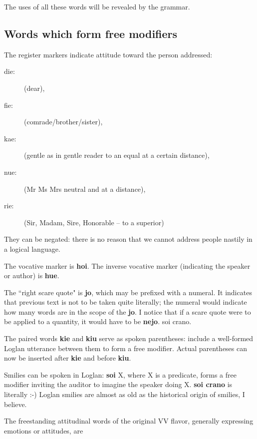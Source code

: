 \documentclass[12pt]{book}
\begin{document}
{The uses of all these words will be revealed by the grammar.

\subsection{Words which form free modifiers}

The register markers indicate attitude toward the person addressed:  

\begin{description}

\item[die:] (dear), \item[fie:] (comrade/brother/sister), \item[kae:] (gentle as in gentle reader to an equal at a certain distance), \item[nue:] (Mr Ms Mrs neutral and at a distance),\item[rie:] (Sir, Madam, Sire, Honorable -- to a superior)

\end{description}   They can be negated:  there is no reason that we cannot address people nastily in a logical language.

The vocative marker is {\bf hoi}.   The inverse vocative marker (indicating the speaker or author) is {\bf hue}.

The ``right scare quote" is {\bf jo}, which may be prefixed with a numeral.   It indicates that previous text is not to be taken quite literally; the numeral would indicate
how many words are in the scope of the {\bf jo}.   I notice that if a scare quote were to be applied to a quantity, it would have to be {\bf nejo}. soi crano.

The paired words {\bf kie} and {\bf kiu} serve as spoken parentheses:  include a well-formed Loglan utterance between them to form a free modifier.   Actual parentheses can now be inserted after {\bf kie}
and before {\bf kiu}.

Smilies can be spoken in Loglan:  {\bf soi} X, where X is a predicate, forms a free modifier inviting the auditor to imagine the speaker doing X.  {\bf soi crano} is literally :-)  Loglan smilies are almost as old as the historical origin of smilies, I believe.

The freestanding attitudinal words of the original VV flavor, generally expressing emotions or attitudes, are  

\begin{description}


\end{description}}
\end{document}
